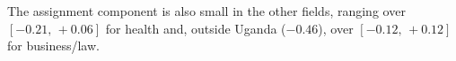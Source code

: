 The assignment component is also small in the other fields, ranging over $[-0.21,\, +0.06]$ for health and, outside Uganda ($-0.46$), over $[-0.12,\, +0.12]$ for business/law.
